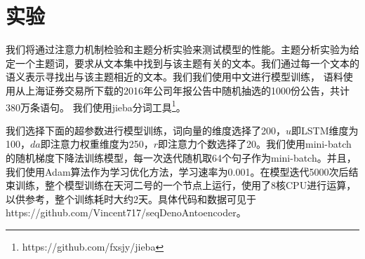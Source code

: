 \documentclass[UTF8,11pt,a4paper,nofonts]{ctexart}
\begin{document}








\section{实验}

我们将通过注意力机制检验和主题分析实验来测试模型的性能。主题分析实验为给定一个主题词，要求从文本集中找到与该主题有关的文本。我们通过每一个文本的语义表示寻找出与该主题相近的文本。我们我们使用中文进行模型训练，
语料使用从上海证券交易所下载的2016年公司年报公告中随机抽选的1000份公告，共计380万条语句。
我们使用jieba分词工具\footnote{https://github.com/fxsjy/jieba}。

我们选择下面的超参数进行模型训练，词向量的维度选择了200，$u$即LSTM维度为100，$da$即注意力权重维度为250，$r$即注意力个数选择了20。我们使用mini-batch的随机梯度下降法训练模型，每一次迭代随机取64个句子作为mini-batch。并且，我们使用Adam算法\cite{Kingma2014AdamAM}作为学习优化方法，学习速率为0.001。在模型迭代5000次后结束训练，整个模型训练在天河二号的一个节点上运行，使用了8核CPU进行运算，以供参考，整个训练耗时大约2天。具体代码和数据可见于 https://github.com/Vincent717/seqDenoAntoencoder。
\end{document}
